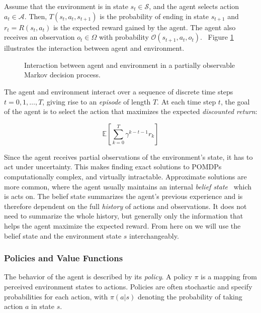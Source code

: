 Assume that the environment is in state \(s_t \in \mathcal{S}\), and the agent selects action \(a_t \in \mathcal{A}\).
Then, \(T(s_t, a_t, s_{t+1})\) is the probability of ending in state \(s_{t+1}\) and \(r_t = R(s_t, a_t)\) is the expected reward gained by the agent.
The agent also receives an observation \(o_t \in \Omega\) with probability \(\mathcal{O}(s_{t+1}, a_t, o_t)\).~\cite{kaelbling_planning_1998}
Figure \ref{fig:pomdp} illustrates the interaction between agent and environment.

\begin{figure}
    \centering
    
    \caption[Partially observable Markov decision process]{Interaction between agent and environment in a partially observable Markov decision process.}
    \label{fig:pomdp}
\end{figure}

The agent and environment interact over a sequence of discrete time steps \(t = 0, 1, \dots, T\), giving rise to an \textit{episode} of length \(T\).
At each time step \(t\), the goal of the agent is to select the action that maximizes the expected \textit{discounted return}:

\begin{equation}
    \mathbb{E} \left[ \sum_{k=0}^T \gamma^{k-t-1} r_k \right]
\end{equation}

Since the agent receives partial observations of the environment's state, it has to act under uncertainty.
This makes finding exact solutions to POMDPs computationally complex, and virtually intractable.
Approximate solutions are more common, where the agent usually maintains an internal \textit{belief state}~\cite{kaelbling_planning_1998} which is acts on.
The belief state summarizes the agent's previous experience and is therefore dependent on the full \textit{history} of actions and observations.
It does not need to summarize the whole history, but generally only the information that helps the agent maximize the expected reward.
From here on we will use the belief state and the environment state \(s\) interchangeably. 

\subsubsection{Policies and Value Functions}
\label{sec:policy-value}

The behavior of the agent is described by its \textit{policy}.
A policy \(\pi\) is a mapping from perceived environment states to actions.
Policies are often stochastic and specify probabilities for each action, with \(\pi(a|s)\) denoting the probability of taking action \(a\) in state \(s\).~\cite{sutton_reinforcement_2018}

